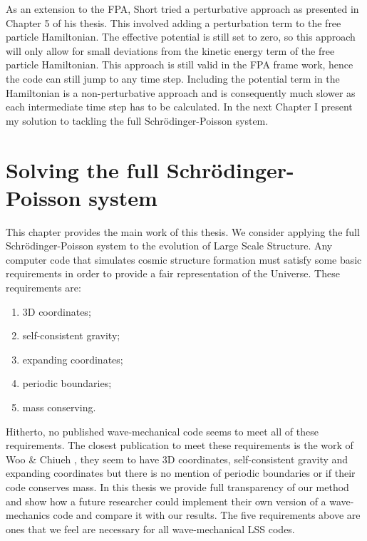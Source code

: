 As an extension to the FPA, Short tried a perturbative approach as presented in Chapter 5 of his thesis. This involved adding a perturbation term to the free particle Hamiltonian. The effective potential is still set to zero, so this approach will only allow for small deviations from the kinetic energy term of the free particle Hamiltonian. This approach is still valid in the FPA frame work, hence the code can still jump to any time step. Including the potential term in the Hamiltonian is a non-perturbative approach and is consequently much slower as each intermediate time step has to be calculated. In the next Chapter I present my solution to tackling the full Schr\"odinger-Poisson system.



%
\newpage
\chapter{Solving the full Schr\"odinger-Poisson system}
\label{ch_5}
This chapter provides the main work of this thesis. We consider applying the full Schr\"odinger-Poisson system to the evolution of Large Scale Structure. Any computer code that simulates cosmic structure formation must satisfy some basic requirements in order to provide a fair representation of the Universe. These requirements are:

\begin{enumerate}
\item 3D coordinates;
\item self-consistent gravity; 
\item expanding coordinates;
\item periodic boundaries;
\item mass conserving.
\end{enumerate}

\noindent Hitherto, no published wave-mechanical code seems to meet all of these requirements. The closest publication to meet these requirements is the work of Woo \& Chiueh \citep{bib_wooc}, they seem to have 3D coordinates, self-consistent gravity and expanding coordinates but there is no mention of periodic boundaries or if their code conserves mass. In this thesis we provide full transparency of our method and show how a future researcher could implement their own version of a wave-mechanics code and compare it with our results. The five requirements above are ones that we feel are necessary for all wave-mechanical LSS codes.

